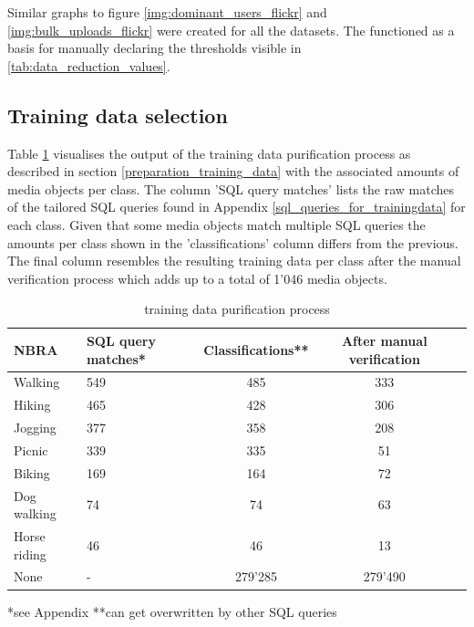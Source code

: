 Similar graphs to figure \ref{img:dominant_users_flickr} and \ref{img:bulk_uploads_flickr} were created for all the datasets. The functioned as a basis for manually declaring the thresholds visible in \ref{tab:data_reduction_values}.

\subsection{Training data selection}
Table \ref{tab:trainingsdata} visualises the output of the training data purification process as described in section \ref{preparation_training_data} with the associated amounts of media objects per class. The column 'SQL query matches' lists the raw matches of the tailored SQL queries found in Appendix \ref{sql_queries_for_trainingdata} for each class. Given that some media objects match multiple SQL queries the amounts per class shown in the 'classifications' column differs from the previous. The final column resembles the resulting training data per class after the manual verification process which adds up to a total of 1'046 media objects. 

\begin{table}[ht]
\begin{center}
\caption{training data purification process}\vspace{1ex}
\label{tab:trainingsdata}
\begin{tabular}{llccc}\hline
NBRA & SQL query matches* & Classifications** & After manual verification \\ \hline
Walking & 549 & 485 & 333 \\
Hiking & 465 & 428 & 306 \\
Jogging & 377 & 358 & 208 \\
Picnic & 339 & 335 & 51 \\
Biking & 169 & 164 & 72 \\
Dog walking & 74 & 74 & 63 \\
Horse riding & 46 & 46 & 13 \\
None & - & 279'285 & 279'490 \\ \hline
\end{tabular}
\newline
*see Appendix **can get overwritten by other SQL queries
\end{center}
\end{table}

